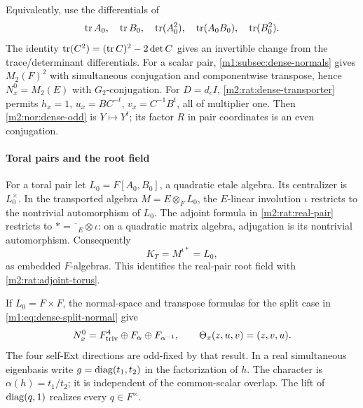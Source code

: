 Equivalently, use the differentials of
\begin{equation}\label{m2:nor:five-invariants}
 \operatorname{tr} A_0,\quad\operatorname{tr} B_0,\quad\operatorname{tr}(A_0^2),\quad
 \operatorname{tr}(A_0B_0),\quad\operatorname{tr}(B_0^2).
\end{equation}
The identity $\operatorname{tr}(C^2)=(\operatorname{tr} C)^2-2\det C$ gives an invertible change
from the trace/determinant differentials. For a scalar pair,
\cref{m1:subsec:dense-normals} gives $M_2(F)^2$ with simultaneous
conjugation and componentwise transpose, hence $N_x^0=M_2(E)$ with
$G_2$-conjugation. For $D=d_cI$, \cref{m2:rat:dense-transporter} permits
$h_x=1$, $u_x=BC^{-t}$, $v_x=C^{-1}B^t$, all of multiplier one.
Then \eqref{m2:nor:dense-odd} is $Y\mapsto Y^t$; its factor $R$ in
pair coordinates is an even conjugation.

\paragraph{Toral pairs and the root field}

For a toral pair let $L_0=F[A_0,B_0]$, a quadratic etale algebra.
Its centralizer is $L_0^\times$. In the transported algebra
$M=E\otimes_F L_0$, the $E$-linear involution $\iota$ restricts
to the nontrivial automorphism of $L_0$. The adjoint formula in
\cref{m2:rat:real-pair} restricts to
$* =\overline{\phantom z}_E\otimes\iota$:
on a quadratic matrix algebra, adjugation is its nontrivial
automorphism. Consequently
\begin{equation}\label{m2:nor:root-field}
 K_T=M^{\iota *}=L_0,
\end{equation}
as embedded $F$-algebras. This identifies the real-pair root field
with \cref{m2:rat:adjoint-torus}.

If $L_0=F\times F$, the normal-space and transpose formulas
for the split case in \cref{m1:eq:dense-split-normal} give
\begin{equation}\label{m2:nor:dense-split}
 N_x^0=F^4_{\mathrm{triv}}\oplus F_\alpha\oplus F_{\alpha^{-1}},
 \qquad\Theta_x(z,u,v)=(z,v,u).
\end{equation}
The four self-Ext directions are odd-fixed by that result. In a
real simultaneous eigenbasis write $g=\operatorname{diag}(t_1,t_2)$ in the
factorization of $h$. The character is
$\alpha(h)=t_1/t_2$; it is independent of the common-scalar overlap.
The lift of $\operatorname{diag}(q,1)$ realizes every $q\in F^\times$.

